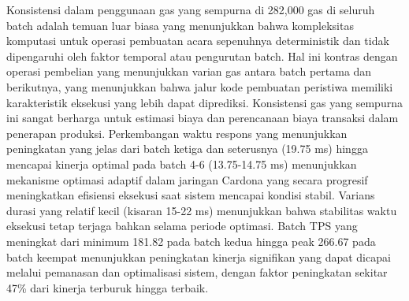 Konsistensi dalam penggunaan gas yang sempurna di 282,000 gas di seluruh batch adalah temuan luar biasa yang menunjukkan bahwa kompleksitas komputasi untuk operasi pembuatan acara sepenuhnya deterministik dan tidak dipengaruhi oleh faktor temporal atau pengurutan batch. Hal ini kontras dengan operasi pembelian yang menunjukkan varian gas antara batch pertama dan berikutnya, yang menunjukkan bahwa jalur kode pembuatan peristiwa memiliki karakteristik eksekusi yang lebih dapat diprediksi. Konsistensi gas yang sempurna ini sangat berharga untuk estimasi biaya dan perencanaan biaya transaksi dalam penerapan produksi. Perkembangan waktu respons yang menunjukkan peningkatan yang jelas dari batch ketiga dan seterusnya (19.75 ms) hingga mencapai kinerja optimal pada batch 4-6 (13.75-14.75 ms) menunjukkan mekanisme optimasi adaptif dalam jaringan Cardona yang secara progresif meningkatkan efisiensi eksekusi saat sistem mencapai kondisi stabil. Varians durasi yang relatif kecil (kisaran 15-22 ms) menunjukkan bahwa stabilitas waktu eksekusi tetap terjaga bahkan selama periode optimasi. Batch TPS yang meningkat dari minimum 181.82 pada batch kedua hingga peak 266.67 pada batch keempat menunjukkan peningkatan kinerja signifikan yang dapat dicapai melalui pemanasan dan optimalisasi sistem, dengan faktor peningkatan sekitar 47\% dari kinerja terburuk hingga terbaik.

